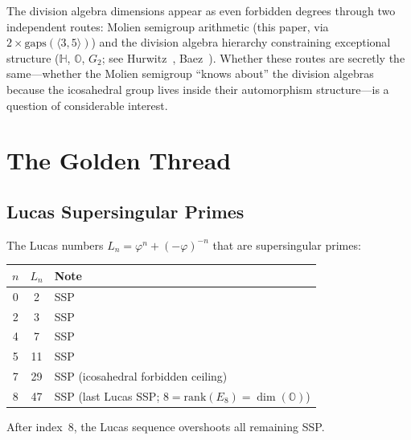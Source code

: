 \documentclass[11pt,letterpaper]{article}
\theoremstyle{definition}
\newcommand{\HH}{\mathbb{H}}
\newcommand{\OO}{\mathbb{O}}
\newcommand{\gen}[1]{\langle #1 \rangle}
\renewcommand{\phi}{\varphi}
\begin{document}
\begin{remarkbox}
The division algebra dimensions appear as even forbidden degrees through two independent routes: Molien semigroup arithmetic (this paper, via $2\times\mathrm{gaps}(\gen{3,5})$) and the division algebra hierarchy constraining exceptional structure ($\HH$, $\OO$, $G_2$; see Hurwitz~\cite{Hurwitz1898}, Baez~\cite{Baez2002}).  Whether these routes are secretly the same---whether the Molien semigroup ``knows about'' the division algebras because the icosahedral group lives inside their automorphism structure---is a question of considerable interest.
\end{remarkbox}
\section{The Golden Thread}\label{sec:golden}
\subsection{Lucas Supersingular Primes}
The Lucas numbers $L_n=\phi^n+(-\phi)^{-n}$ that are supersingular primes:
\begin{center}
\begin{tabular}{ccl}
\toprule
$n$ & $L_n$ & Note \\
\midrule
0 & 2  & SSP \\
2 & 3  & SSP \\
4 & 7  & SSP \\
5 & 11 & SSP \\
7 & 29 & SSP (icosahedral forbidden ceiling) \\
8 & 47 & SSP (last Lucas SSP; $8=\mathrm{rank}(E_8)=\dim(\OO)$) \\
\bottomrule
\end{tabular}
\end{center}
After index~8, the Lucas sequence overshoots all remaining SSP.
\end{document}
